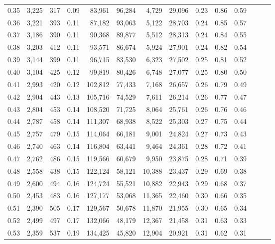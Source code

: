 \begin{tabular}{rrrrrrrrrrrrrr}
0.35 &  3,225 &  317 &  0.09 &   83,961 &   96,284 &   4,729 &  29,096 &  0.23 &  0.86 &      0.59 \\
0.36 &  3,221 &  393 &  0.11 &   87,182 &   93,063 &   5,122 &  28,703 &  0.24 &  0.85 &      0.57 \\
0.37 &  3,186 &  390 &  0.11 &   90,368 &   89,877 &   5,512 &  28,313 &  0.24 &  0.84 &      0.55 \\
0.38 &  3,203 &  412 &  0.11 &   93,571 &   86,674 &   5,924 &  27,901 &  0.24 &  0.82 &      0.54 \\
0.39 &  3,144 &  399 &  0.11 &   96,715 &   83,530 &   6,323 &  27,502 &  0.25 &  0.81 &      0.52 \\
0.40 &  3,104 &  425 &  0.12 &   99,819 &   80,426 &   6,748 &  27,077 &  0.25 &  0.80 &      0.50 \\
0.41 &  2,993 &  420 &  0.12 &  102,812 &   77,433 &   7,168 &  26,657 &  0.26 &  0.79 &      0.49 \\
0.42 &  2,904 &  443 &  0.13 &  105,716 &   74,529 &   7,611 &  26,214 &  0.26 &  0.77 &      0.47 \\
0.43 &  2,804 &  453 &  0.14 &  108,520 &   71,725 &   8,064 &  25,761 &  0.26 &  0.76 &      0.46 \\
0.44 &  2,787 &  458 &  0.14 &  111,307 &   68,938 &   8,522 &  25,303 &  0.27 &  0.75 &      0.44 \\
0.45 &  2,757 &  479 &  0.15 &  114,064 &   66,181 &   9,001 &  24,824 &  0.27 &  0.73 &      0.43 \\
0.46 &  2,740 &  463 &  0.14 &  116,804 &   63,441 &   9,464 &  24,361 &  0.28 &  0.72 &      0.41 \\
0.47 &  2,762 &  486 &  0.15 &  119,566 &   60,679 &   9,950 &  23,875 &  0.28 &  0.71 &      0.39 \\
0.48 &  2,558 &  438 &  0.15 &  122,124 &   58,121 &  10,388 &  23,437 &  0.29 &  0.69 &      0.38 \\
0.49 &  2,600 &  494 &  0.16 &  124,724 &   55,521 &  10,882 &  22,943 &  0.29 &  0.68 &      0.37 \\
0.50 &  2,453 &  483 &  0.16 &  127,177 &   53,068 &  11,365 &  22,460 &  0.30 &  0.66 &      0.35 \\
0.51 &  2,390 &  505 &  0.17 &  129,567 &   50,678 &  11,870 &  21,955 &  0.30 &  0.65 &      0.34 \\
0.52 &  2,499 &  497 &  0.17 &  132,066 &   48,179 &  12,367 &  21,458 &  0.31 &  0.63 &      0.33 \\
0.53 &  2,359 &  537 &  0.19 &  134,425 &   45,820 &  12,904 &  20,921 &  0.31 &  0.62 &      0.31 \\

\end{tabular}
